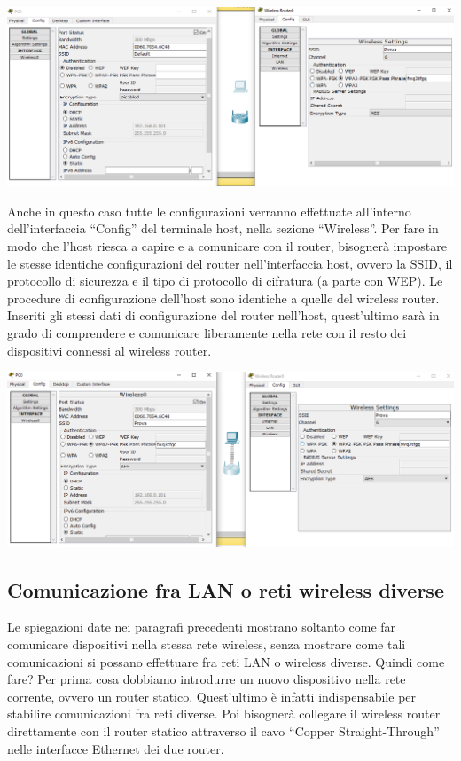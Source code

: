 \begin{center}
    \includegraphics[width=\linewidth]{images/08.wireless/11.png}
\end{center}

Anche in questo caso tutte le configurazioni verranno effettuate all’interno dell’interfaccia “Config” del terminale host, nella sezione “Wireless”. Per fare in modo che l’host riesca a capire e a comunicare con il router, bisognerà impostare le stesse identiche configurazioni del router nell’interfaccia host, ovvero la SSID, il protocollo di sicurezza e il tipo di protocollo di cifratura (a parte con WEP). Le procedure di configurazione dell’host sono identiche a quelle del wireless router. Inseriti gli stessi dati di configurazione del router nell’host, quest’ultimo sarà in grado di comprendere e comunicare liberamente nella rete con il resto dei dispositivi connessi al wireless router.

\begin{center}
    \includegraphics[width=\linewidth]{images/08.wireless/12.png}
\end{center}

\subsection{Comunicazione fra LAN o reti wireless diverse}
Le spiegazioni date nei paragrafi precedenti mostrano soltanto come far comunicare dispositivi nella stessa rete wireless, senza mostrare come tali comunicazioni si possano effettuare fra reti LAN o wireless diverse. Quindi come fare? Per prima cosa dobbiamo introdurre un nuovo dispositivo nella rete corrente, ovvero un router statico. Quest’ultimo è infatti indispensabile per stabilire comunicazioni fra reti diverse. Poi bisognerà collegare il wireless router direttamente con il router statico attraverso il cavo “Copper Straight-Through” nelle interfacce Ethernet dei due router.


